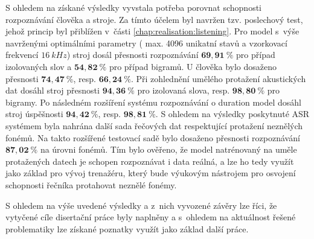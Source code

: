 S ohledem na získané výsledky vyvstala potřeba porovnat schopnosti rozpoznávání člověka a stroje. Za tímto účelem byl navržen tzv. poslechový test, jehož princip byl přiblížen v~části \ref{chap:realisation:listening}. Pro model s~výše navrženými optimálními parametry ( max. 4096 unikatní stavů a vzorkovací frekvencí $16\ kHz$) stroj dosál přesnosti rozpoznávání  $\boldsymbol{69,91~\%}$ pro případ izolovaných slov a $\boldsymbol{54,82~\%}$ pro případ bigramů. U člověka bylo dosaženo přesnosti $\boldsymbol{74,47~\%}$, resp. $\boldsymbol{66,24~\%}$. Při zohlednění umělého protažení akustických dat dosáhl stroj přesnosti $\boldsymbol{94,36~\%}$ pro izolovaná slova, resp. $\boldsymbol{98,80~\%}$ pro bigramy. Po následném rozšíření systému rozpoznávání o duration model dosáhl stroj úspěšnosti $\boldsymbol{94,42~\%}$, resp. $\boldsymbol{98,81~\%}$. S ohledem na výsledky poskytnuté ASR systémem byla nahrána další sada řečových dat respektující protažení neznělých fonémů. Na takto rozšířené testovací sadě bylo dosaženo přesnosti rozpoznávání $\boldsymbol{87,02~\%}$ na úrovni fonémů. Tím bylo ověřeno, že model natrénovaný na uměle protažených datech je schopen rozpoznávat i data reálná, a lze ho tedy využít jako základ pro vývoj trenažéru, který bude výukovým nástrojem pro osvojení schopnosti řečníka protahovat neznělé fonémy.

S ohledem na výše uvedené výsledky a z~nich vyvozené závěry lze říci, že vytyčené cíle disertační práce byly naplněny a s~ohledem na aktuálnost řešené problematiky lze získané poznatky využít jako základ další práce.










